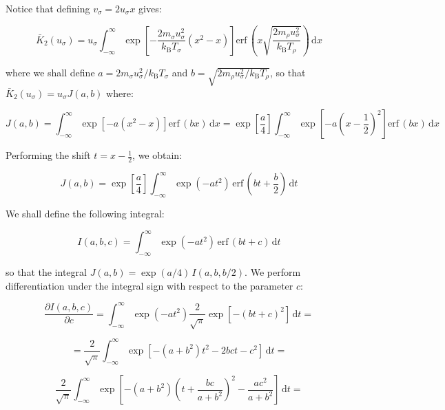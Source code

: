 Notice that defining $v_\sigma=2u_\sigma x$ gives:

\begin{equation}
    \bar{K}_2(u_\sigma)=u_\sigma\int_{-\infty}^\infty\exp{\left[-\frac{2m_\sigma u_\sigma^2}{k_\mathrm{B}T_\sigma}(x^2-x)\right]}\text{erf}\,\left(x\sqrt{\frac{2m_\rho u_\sigma^2}{k_\mathrm{B}T_\rho}}\right)\,\mathrm{d}x
\end{equation}

where we shall define $a=2m_\sigma u_\sigma^2/k_\mathrm{B}T_\sigma$ and $b=\sqrt{2m_\rho u_\sigma^2/k_\mathrm{B}T_\rho}$, so that $\bar{K}_2(u_\sigma)=u_\sigma J(a,b)$ where:

\begin{equation}
    J(a,b)=\int_{-\infty}^\infty\exp{\left[-a(x^2-x)\right]}\text{erf}\,(bx)\,\mathrm{d}x=\exp{\left[\frac{a}{4}\right]}\int_{-\infty}^\infty\exp{\left[-a\left(x-\frac{1}{2}\right)^2\right]}\text{erf}\,\left(bx\right)\,\mathrm{d}x
\end{equation}

Performing the shift $t=x-\frac{1}{2}$, we obtain:

\begin{equation}
    J(a,b)=\exp{\left[\frac{a}{4}\right]}\int_{-\infty}^\infty\exp{\left(-at^2\right)}\,\text{erf}\,\left(bt+\frac{b}{2}\right)\,\mathrm{d}t
\end{equation}

We shall define the following integral:

\begin{equation}
    I(a,b,c)=\int_{-\infty}^\infty\exp{(-at^2)}\,\text{erf}\,(bt+c)\,\mathrm{d}t
\end{equation}

so that the integral $J(a,b)=\exp{(a/4)}\,I(a,b,b/2)$. We perform differentiation under the integral sign with respect to the parameter $c$:

\begin{equation}
    \frac{\partial I(a,b,c)}{\partial c}=\int_{-\infty}^\infty\exp{(-at^2)}\frac{2}{\sqrt{\pi}}\exp{\left[-(bt+c)^2\right]}\,\mathrm{d}t=
\end{equation}

\begin{equation}
    =\frac{2}{\sqrt{\pi}}\int_{-\infty}^\infty\exp{\left[-(a+b^2)t^2-2bct-c^2\right]}\,\mathrm{d}t=
\end{equation}

\begin{equation}
    \frac{2}{\sqrt{\pi}}\int_{-\infty}^\infty\exp{\left[-(a+b^2)\left(t+\frac{bc}{a+b^2}\right)^2-\frac{ac^2}{a+b^2}\right]}\,\mathrm{d}t=
\end{equation}

